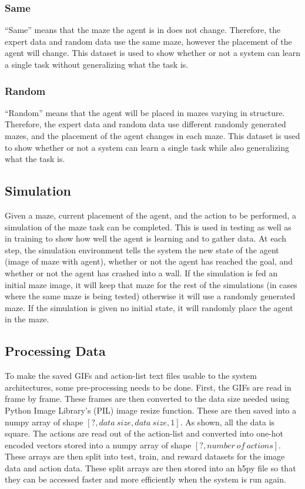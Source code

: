 \documentclass[12pt,american]{report}
\begin{document}
\subsubsection{Same}
``Same'' means that the maze the agent is in does not change.  Therefore, the expert data and random data use the same maze, however the placement of the agent will change.  This dataset is used to show whether or not a system can learn a single task without generalizing what the task is.

\subsubsection{Random}
``Random'' means that the agent will be placed in mazes varying in structure.  Therefore, the expert data and random data use different randomly generated mazes, and the placement of the agent changes in each maze.  This dataset is used to show whether or not a system can learn a single task while also generalizing what the task is.

\subsection{Simulation}
Given a maze, current placement of the agent, and the action to be performed, a simulation of the maze task can be completed.  This is used in testing as well as in training to show how well the agent is learning and to gather data.  At each step, the simulation environment tells the system the new state of the agent (image of maze with agent), whether or not the agent has reached the goal, and whether or not the agent has crashed into a wall.  If the simulation is fed an initial maze image, it will keep that maze for the rest of the simulations (in cases where the same maze is being tested) otherwise it will use a randomly generated maze.  If the simulation is given no initial state, it will randomly place the agent in the maze.

\subsection{Processing Data}
To make the saved GIFs and action-list text files usable to the system architectures, some pre-processing needs to be done.  First, the GIFs are read in frame by frame.  These frames are then converted to the data size needed using Python Image Library's (PIL) image resize function.  These are then saved into a numpy array of shape $[?,data~size, data~size, 1]$.  As shown, all the data is square.  The actions are read out of the action-list and converted into one-hot encoded vectors stored into a numpy array of shape $[?,number~of~actions]$.  These arrays are then split into test, train, and reward datasets for the image data and action data.  These split arrays are then stored into an h5py file so that they can be accessed faster and more efficiently when the system is run again. 
\end{document}
